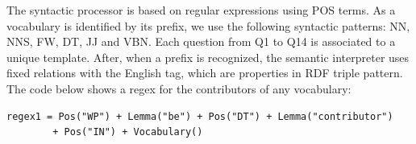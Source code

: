 \documentclass[runningheads,a4paper]{llncs}
\newcommand{\todo}[1]{\noindent\textcolor{red}{{\bf \{TODO}: #1{\bf \}}}}
\begin{document}
The syntactic processor is based on regular expressions using POS terms. As a vocabulary is identified by its prefix, we use  the following syntactic patterns: NN, NNS, FW, DT, JJ and VBN. Each question from Q1 to Q14 is associated to a unique template. After, when a prefix is recognized, the semantic interpreter uses fixed relations with the English tag, which are properties in RDF triple pattern. The code below shows a regex for the contributors of any vocabulary: 
\begin{verbatim}
regex1 = Pos("WP") + Lemma("be") + Pos("DT") + Lemma("contributor")  
        + Pos("IN") + Vocabulary()
\end{verbatim}


\end{document}

